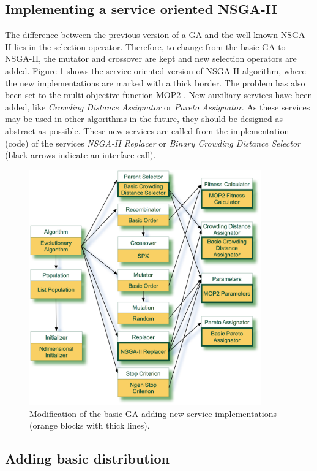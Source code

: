 \subsection{Implementing a service oriented NSGA-II}
\label{sec:nsga2}

The difference between the previous version of a GA and the well known NSGA-II \cite{NSGA2} lies in the selection operator. Therefore, to change from the basic GA to NSGA-II, the mutator and crossover are kept and new selection operators are added. Figure \ref{fig:nsga2} shows the service oriented version of NSGA-II algorithm, where the new implementations are marked with a thick border. The problem has also been set to the multi-objective function MOP2 \cite{ReviewMultiobj06}. New auxiliary services have been added, like {\em Crowding Distance Assignator} or {\em Pareto Assignator}. As these services may be used in other algorithms in the future, they should be designed as abstract as possible. These new services are called from the implementation (code) of the services {\em NSGA-II Replacer} or {\em Binary Crowding Distance Selector} (black arrows indicate an interface call). 




\begin{figure}
\centering
\includegraphics[width=10cm]{gfx/soaea/nsga2.jpg}
\caption{Modification of the basic GA adding new service implementations (orange blocks with thick lines).}
\label{fig:nsga2}
\end{figure}



\subsection{Adding basic distribution}
\label{sec:distribution}

